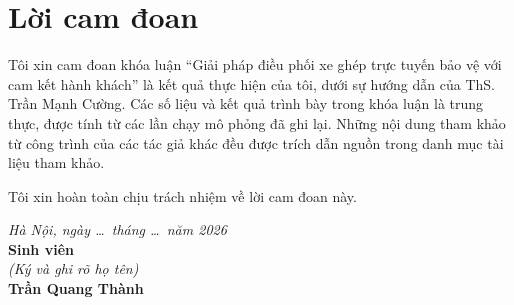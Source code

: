 \chapter*{Lời cam đoan}

Tôi xin cam đoan khóa luận ``Giải pháp điều phối xe ghép trực tuyến bảo vệ với cam kết hành khách'' là kết quả
thực hiện của tôi, dưới sự hướng dẫn của ThS. Trần Mạnh Cường. Các số liệu và kết quả trình bày trong khóa luận là
trung thực, được tính từ các lần chạy mô phỏng đã ghi lại. Những nội dung tham khảo từ công trình của các tác giả
khác đều được trích dẫn nguồn trong danh mục tài liệu tham khảo.

Tôi xin hoàn toàn chịu trách nhiệm về lời cam đoan này.

\vspace{36pt}
\begin{flushright}
\begin{minipage}{7.5cm}
\centering
\textit{Hà Nội, ngày \ldots\ tháng \ldots\ năm 2026}\\[4pt]
\textbf{Sinh viên}\\
\textit{(Ký và ghi rõ họ tên)}\\[70pt]
\textbf{Trần Quang Thành}
\end{minipage}
\end{flushright}

\clearpage
